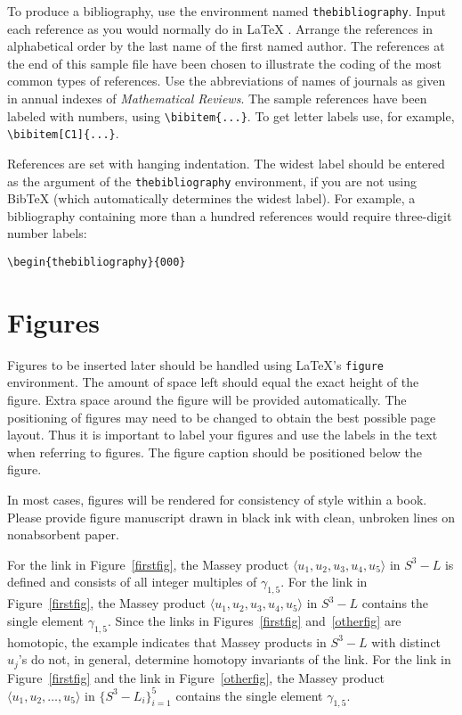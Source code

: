 To produce a bibliography, use the environment named
\verb+thebibliography+. Input each reference as you would normally do in
\LaTeX{} \cite{lamport:latex}. Arrange the references in alphabetical
order by the last name of the first named author.  The references at the
end of this sample file have been chosen to illustrate the coding of the
most common types of references. Use the abbreviations of names of
journals as given in annual indexes of {\it Mathematical Reviews}.
The sample references have been labeled with numbers, using
\verb+\bibitem{...}+. To get letter labels use, for example,
\verb+\bibitem[C1]{...}+.

References are set with hanging indentation.  The widest label should be
entered as the argument of the {\tt thebibliography} environment, if you
are not using Bib\TeX{} (which automatically determines the widest
label). For example, a bibliography containing more than a hundred
references would require three-digit number labels:
\par\begin{centering}\smallskip
\begin{verbatim}
\begin{thebibliography}{000}
\end{verbatim}
\smallskip\end{centering}

\section{Figures}

Figures to be inserted later should be handled using \LaTeX's \verb+figure+
environment.  The amount of space left should equal the exact height of the
figure.  Extra space around the figure will be provided automatically.  The
positioning of figures may need to be changed to obtain the best possible page
layout.  Thus it is important to label your figures and use the labels in the
text when referring to figures.  The figure caption should be positioned below
the figure.

In most cases, figures will be rendered for consistency of style within a
book.  Please provide figure manuscript drawn in black ink with clean,
unbroken lines on nonabsorbent paper.

\begin{example}
For the link in Figure~\ref{firstfig}, the Massey product $\langle u_1,
u_2, u_3, u_4, u_5\rangle$ in $S^3-L$ is defined and consists of all
integer multiples of $\gamma_{1,5}$.  For the link in
Figure~\ref{firstfig}, the Massey product $\langle u_1, u_2, u_3, u_4,
u_5\rangle$ in $S^3-L$ contains the single element $\gamma_{1,5}$. 
Since the links in Figures~\ref{firstfig} and~\ref{otherfig} are
homotopic, the example indicates that Massey products in $S^3-L$ with
distinct $u_j$'s do not, in general, determine homotopy invariants of
the link.  For the link in Figure~\ref{firstfig} and the link in
Figure~\ref{otherfig}, the Massey product $\langle u_1, u_2, \dots,
u_5\rangle$ in $\{S^3-L_i\}_{i=1}^5$ contains the single element
$\gamma_{1,5}$.
\end{example}

